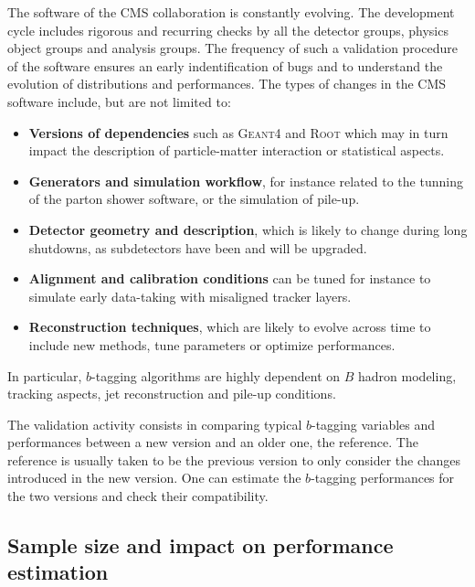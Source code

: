     The software of the CMS collaboration is constantly evolving. The development cycle
    includes rigorous and recurring checks by all the detector groups, physics
    object groups and analysis groups. The frequency of such a validation procedure
    of the software ensures an early indentification of bugs and to understand
    the evolution of distributions and performances. The types of changes in the CMS
    software include, but are not limited to:
    \begin{itemize}
        \item \textbf{Versions of dependencies} such as \textsc{Geant4} and
              \textsc{Root} which may in turn impact the description of particle-matter
              interaction or statistical aspects.
        \item \textbf{Generators and simulation workflow}, for instance related to
              the tunning of the parton shower software, or the simulation of pile-up.
        \item \textbf{Detector geometry and description}, which is likely to change during
              long shutdowns, as subdetectors have been and will be upgraded.
        \item \textbf{Alignment and calibration conditions} can be tuned for instance to
              simulate early data-taking with misaligned tracker layers.
        \item \textbf{Reconstruction techniques}, which are likely to evolve across time to include
              new methods, tune parameters or optimize performances.
    \end{itemize}

    In particular, $b$-tagging algorithms are highly dependent on $B$ hadron modeling, tracking
    aspects, jet reconstruction and pile-up conditions.

    The validation activity consists in comparing typical $b$-tagging variables and performances
    between a new version and an older one, the reference. The reference is usually taken to
    be the previous version to only consider the changes introduced in the new version.
    One can estimate the $b$-tagging performances for the two versions and check their
    compatibility.

    \subsection{Sample size and impact on performance estimation}

